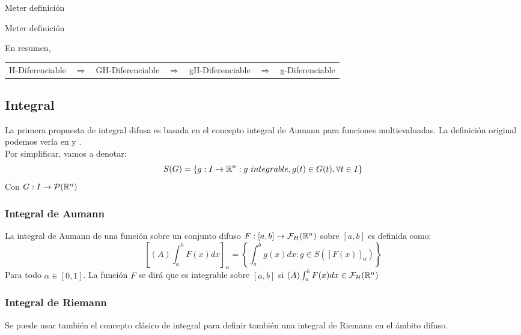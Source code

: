 \begin{definicion}
Meter definición
\end{definicion}

\begin{definicion}
	Meter definición
\end{definicion}

En resumen,
\begin{table}[h]
	\centering
	\begin{tabular}{lllllll}
		H-Diferenciable & $\Rightarrow$ & GH-Diferenciable & $\Rightarrow$ & gH-Diferenciable & $\Rightarrow$ & g-Diferenciable
	\end{tabular}
\end{table}

\subsection{Integral}
La primera propuesta de integral difusa es basada en el concepto integral de Aumann para funciones multievaluadas. La definición original podemos verla en \cite{integral1} y \cite{integral2}. \\
Por simplificar, vamos a denotar:
\[
	S(G) = \{g : I \rightarrow \mathbb R^n : g ~ integrable, g(t) \in G(t), \forall t \in I \}
\]
Con $G : I \rightarrow \mathcal{P}(\mathbb R^n)$

\subsubsection{Integral de Aumann}
\begin{definicion}
	La integral de Aumann de una función sobre un conjunto difuso $F : [a, b] \rightarrow \mathcal{F}_H(\mathbb R^n)$ sobre $[a, b]$ es definida como: 
	\[
		\left[
		(A) \int_{a}^{b} F(x) dx
		\right]_\alpha = \left\{
			\int_{a}^{b} g(x) dx : g \in S([F(x)]_\alpha)
		\right\}
	\]
	Para todo $\alpha \in [0, 1]$. La función $F$ se dirá que es integrable sobre $[a, b]$ si $(A) \int_{a}^{b} F(x) dx \in \mathcal{F}_\mathcal{H}(\mathbb R^n)$
\end{definicion}

\subsubsection{Integral de Riemann}
Se puede usar también el concepto clásico de integral para definir también una integral de Riemann en el ámbito difuso.

